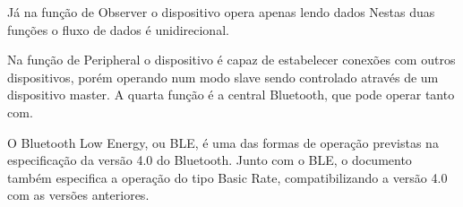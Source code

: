 Já na função de Observer o dispositivo opera apenas lendo dados Nestas duas
funções o fluxo de dados é unidirecional.
    
Na função de Peripheral o dispositivo é capaz de estabelecer conexões com
outros dispositivos, porém operando num modo slave sendo controlado através de
um dispositivo master. A quarta função é a central Bluetooth, que pode operar tanto com.





O Bluetooth Low Energy, ou BLE, é uma das formas de operação previstas na
especificação da versão 4.0 do Bluetooth. Junto com o BLE, o documento também
especifica a operação do tipo Basic Rate, compatibilizando a versão 4.0 com as
versões anteriores.












